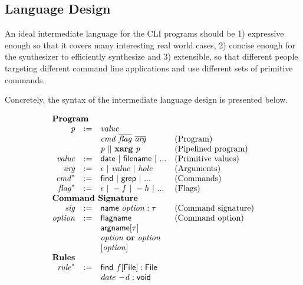 \subsection{Language Design}
\label{subsec:represent}
An ideal intermediate language for the CLI programs should be 1) expressive enough so that it covers many interesting real world cases, 2) concise enough for the synthesizer to efficiently synthesize and 3) extensible, so that different people targeting different command line applications and use different sets of primitive commands.

Concretely, the syntax of the intermediate language design is presented below.

\begin{figure}
\[
\begin{array}{rlll}
\multicolumn{3}{l}{\textbf{Program}}\\
\mathit{p} & := & \mathit{value} \\
    &  & \mathit{cmd}~\overline{\mathit{flag}}~\overline{\mathit{arg}} & \textrm{(Program)}\\
    &  & \mathit{p} ~\|~ \mathbf{xarg}~\mathit{p} & \textrm{(Pipelined program)}\\
\mathit{value} & := & \mathsf{date} ~|~ \mathsf{filename} ~|~ ... & \textrm{(Primitive values)}\\
\mathit{arg} & := & \epsilon ~|~ \mathit{value} ~|~ \mathit{hole} & \textrm{(Arguments)}\\
\mathit{cmd}^{*} & := & \mathsf{find} ~|~ \mathsf{grep} ~|~ ... & \textrm{(Commands)}\\
\mathit{flag}^{*} & := & \epsilon ~|~ -f ~|~ -h ~|~ ... & \textrm{(Flags)}\\
\multicolumn{3}{l}{\textbf{Command Signature}}\\
\mathit{sig} & := & \mathsf{name}~\mathit{option}:\tau & \textrm{(Command signature)}\\
\mathit{option} &:= & \mathsf{flagname} & \textrm{(Command option)}\\
                &   & \mathsf{argname}[\tau]\\
                &   & \mathit{option}~\mathbf{or}~\mathit{option}\\
                &   & [ \mathit{option} ]\\
\multicolumn{3}{l}{\textbf{Rules}}\\
\mathit{rule}^{*} &:=& \mathsf{find}~f[\mathsf{File}] : \mathsf{File}\\
                  &  & \mathit{date}~\mathit{-d} : \mathsf{void}\\

\end{array}\]
\end{figure}
